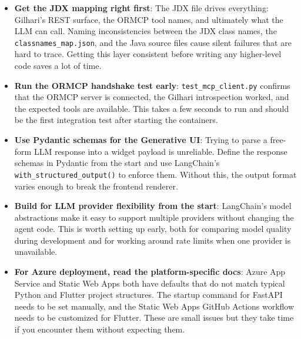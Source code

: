 \documentclass{book}
\begin{document}
\begin{itemize}
\item \textbf{Get the JDX mapping right first}: The JDX file drives everything: Gilhari's REST surface, the ORMCP tool names, and ultimately what the LLM can call. Naming inconsistencies between the JDX class names, the \texttt{classnames\_map.json}, and the Java source files cause silent failures that are hard to trace. Getting this layer consistent before writing any higher-level code saves a lot of time.

\item \textbf{Run the ORMCP handshake test early}: \texttt{test\_mcp\_client.py} confirms that the ORMCP server is connected, the Gilhari introspection worked, and the expected tools are available. This takes a few seconds to run and should be the first integration test after starting the containers.

\item \textbf{Use Pydantic schemas for the Generative UI}: Trying to parse a free-form LLM response into a widget payload is unreliable. Define the response schemas in Pydantic from the start and use LangChain's \texttt{with\_structured\_output()} to enforce them. Without this, the output format varies enough to break the frontend renderer.

\item \textbf{Build for LLM provider flexibility from the start}: LangChain's model abstractions make it easy to support multiple providers without changing the agent code. This is worth setting up early, both for comparing model quality during development and for working around rate limits when one provider is unavailable.

\item \textbf{For Azure deployment, read the platform-specific docs}: Azure App Service and Static Web Apps both have defaults that do not match typical Python and Flutter project structures. The startup command for FastAPI needs to be set manually, and the Static Web Apps GitHub Actions workflow needs to be customized for Flutter. These are small issues but they take time if you encounter them without expecting them.
\end{itemize}


\end{document}
